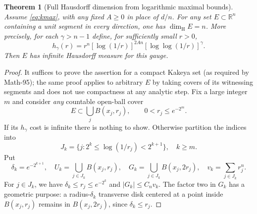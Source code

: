 \documentclass[11pt,a4paper]{article}
\numberwithin{equation}{section}
\newtheorem{theorem}{Theorem}[section]
\theoremstyle{definition}
\theoremstyle{remark}
\newcommand{\R}{\mathbb R}
\newcommand{\dimH}{\dim_{\mathrm H}}
\begin{document}
\begin{theorem}[Full Hausdorff dimension from logarithmic maximal bounds]
\label{thm:hausdorff}
Assume \eqref{eq:kmax}, with any fixed $A\ge0$ in place of $d/n$.
For any set $E\subset\R^n$ containing a unit segment in every
direction, one has $\dimH E=n$. More precisely, for each
$\gamma>n-1$ define, for sufficiently small $r>0$,
\begin{equation}\label{eq:gauge}
 h_\gamma(r)=r^n[\log(1/r)]^{2An}
                        [\log\log(1/r)]^{\gamma}.
\end{equation}
Then $E$ has infinite Hausdorff measure for this gauge.
\end{theorem}
\begin{proof}
It suffices to prove the assertion for a compact Kakeya set
(as required by Math-95); the same proof applies to arbitrary $E$ by
taking covers of its witnessing segments and does not use
compactness at any analytic step. Fix a large integer $m$ and
consider \emph{any} countable open-ball cover
\begin{equation}\label{eq:cover}
 E\subset\bigcup_j B(x_j,r_j),\qquad
             0<r_j\le e^{-2^m}.
\end{equation}
If its $h_\gamma$ cost is infinite there is nothing to show.
Otherwise partition the indices into
\[
 J_k=\{j:2^k\le\log(1/r_j)<2^{k+1}\},\quad k\ge m.
\]
Put
\begin{equation}\label{eq:gk}
 \delta_k=e^{-2^{k+1}},\quad
 U_k=\bigcup_{j\in J_k}B(x_j,r_j),\quad
 G_k=\bigcup_{j\in J_k}B(x_j,2r_j),\quad
 v_k=\sum_{j\in J_k}r_j^n.
\end{equation}
For $j\in J_k$, we have $\delta_k\le r_j\le e^{-2^k}$ and
$|G_k|\le C_nv_k$. The factor two in $G_k$ has a geometric
purpose: a radius-$\delta_k$ transverse disk centered at a point
inside $B(x_j,r_j)$ remains in $B(x_j,2r_j)$, since
$\delta_k\le r_j$.


\end{proof}
\end{document}
